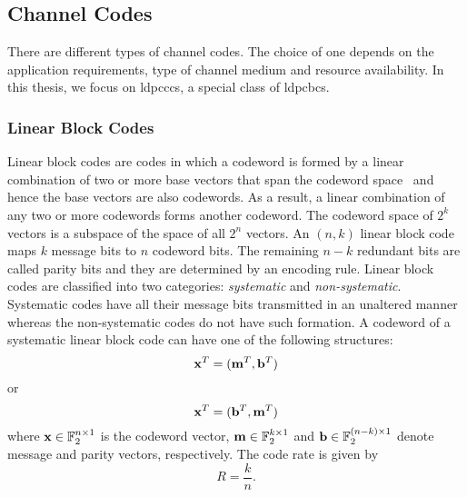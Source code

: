 \subsection{Channel Codes}
There are different types of channel codes. The choice of one depends on the application requirements, type of channel medium and resource availability. In this thesis, we focus on \acp{ldpccc}, a special class of \acp{ldpcbc}.
\subsubsection{Linear Block Codes}
Linear block codes are codes in which a codeword is formed by a linear combination of two or more base vectors that span the codeword space~\cite{proak} and hence the base vectors are also codewords. As a result, a linear combination of any two or more codewords forms another codeword. The codeword space of $2^k$ vectors is a subspace of the space of all $2^n$ vectors. An $(n,k)$ linear block code maps $k$ message bits to $n$ codeword bits. The remaining $n-k$ redundant bits are called parity bits and they are determined by an encoding rule. Linear block codes are classified into two categories: \emph{systematic} and \emph{non-systematic}. Systematic codes have all their message bits transmitted in an unaltered manner whereas the non-systematic codes do not have such formation. A codeword of a systematic linear block code can have one of the following structures: $$\mathbf{x}^T=(\mathbf{m}^T,\mathbf{b}^T)$$ or $$\mathbf{x}^T=(\mathbf{b}^T,\mathbf{m}^T)$$ where $\mathbf{x}\in\mathbb{F}_2^{n\times 1}$ is the codeword vector, $\mathbf{m}\in\mathbb{F}_2^{k\times 1}$ and $\mathbf{b}\in\mathbb{F}_2^{(n-k)\times 1}$ denote message and parity vectors, respectively. The code rate is given by $$R=\frac{k}{n}.$$

